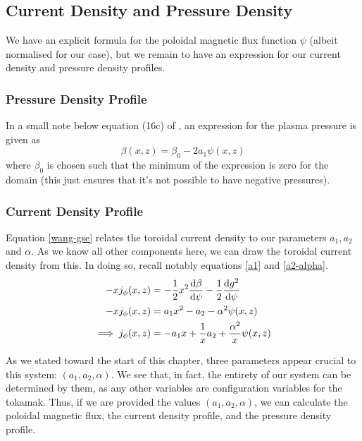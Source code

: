 \subsection{Current Density and Pressure Density}
We have an explicit formula for the poloidal magnetic flux function $\psi$ (albeit normalised for our case), but we remain to have an 
expression for our current density and pressure density profiles.

\subsubsection{Pressure Density Profile}
In a small note below equation (16c) of \cite{wang-analytic-solution}, an expression for the plasma pressure is given as
\begin{equation}
    \label{pressure-profile} \beta(x,z) = \beta_0 - 2a_1 \psi(x,z)
\end{equation}
where $\beta_0$ is chosen such that the minimum of the expression is zero for the domain (this just ensures that it's not possible 
to have negative pressures).

\subsubsection{Current Density Profile}
Equation \ref{wang-gse} relates the toroidal current density to our parameters $a_1, a_2$ and $\alpha$. As we know 
all other components here, we can draw the toroidal current density from this. In doing so, recall notably equations \ref{a1} and \ref{a2-alpha}.
\begin{align}
    \notag -xj_{\phi}(x,z) &= -\frac{1}{2}x^2 \dv{\beta}{\psi} - \frac{1}{2} \dv{g^2}{\psi} \\
    \notag -xj_{\phi}(x,z) &= a_1 x^2 - a_2 - \alpha^2 \psi(x,z) \\
    \label{current-profile} \implies j_{\phi}(x,z) &= -a_1 x + \frac{1}{x} a_2 + \frac{\alpha^2}{x} \psi(x,z)
\end{align}

\begin{remark}
    As we stated toward the start of this chapter, three parameters appear crucial to this system: $(a_1, a_2, \alpha)$. We see that, in fact, 
    the entirety of our system can be determined by them, as any other variables are configuration variables for the tokamak. Thus, if we 
    are provided the values $(a_1, a_2, \alpha)$, we can calculate the poloidal magnetic flux, the current density profile, and the 
    pressure density profile.
\end{remark}

